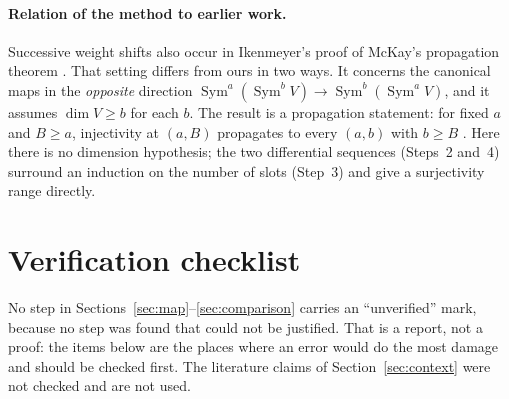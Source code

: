 \documentclass[11pt]{article}
\theoremstyle{remark}
\DeclareMathOperator{\Sym}{Sym}
\begin{document}
\paragraph{Relation of the method to earlier work.}
Successive weight shifts also occur in Ikenmeyer's proof
\cite[Section~5]{Ikenmeyer} of McKay's propagation theorem \cite{McKay}.
That setting differs from ours in two ways. It concerns the canonical maps
in the \emph{opposite} direction
$\Sym^a(\Sym^b V)\longrightarrow\Sym^b(\Sym^a V)$, and it assumes
$\dim V\ge b$ for each $b$. The result is a propagation statement: for
fixed $a$ and $B\ge a$, injectivity at $(a,B)$ propagates to every $(a,b)$
with $b\ge B$ \cite[Theorem~1.3 and Section~3]{Ikenmeyer}. Here there is no
dimension hypothesis; the two differential sequences (Steps~2 and~4)
surround an induction on the number of slots (Step~3) and give a
surjectivity range directly.

\section{Verification checklist}\label{sec:checklist}

No step in Sections~\ref{sec:map}--\ref{sec:comparison} carries an
``unverified'' mark, because no step was found that could not be justified.
That is a report, not a proof: the items below are the places where an
error would do the most damage and should be checked first. The literature
claims of Section~\ref{sec:context} were not checked and are not used.
\end{document}
